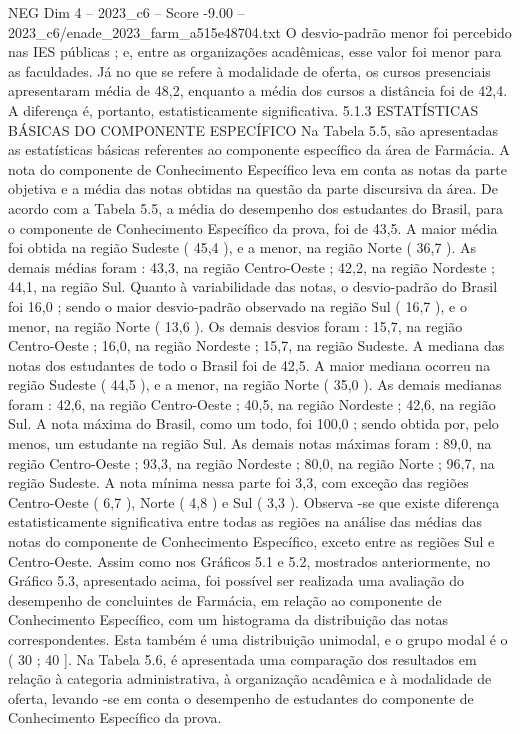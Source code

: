 \begin{textsample}{NEG Dim 4 – 2023\_c6 – Score -9.00 – 2023\_c6/enade\_2023\_farm\_a515e48704.txt}
O desvio-padrão menor foi percebido nas IES públicas ; e, entre as organizações acadêmicas, esse valor foi menor para as faculdades.
Já no que se refere à modalidade de oferta, os cursos presenciais apresentaram média de 48,2, enquanto a média dos cursos a distância foi de 42,4.
A diferença é, portanto, estatisticamente significativa. 5.1.3 ESTATÍSTICAS BÁSICAS DO COMPONENTE ESPECÍFICO Na Tabela 5.5, são apresentadas as estatísticas básicas referentes ao componente específico da área de Farmácia.
A nota do componente de Conhecimento Específico leva em conta as notas da parte objetiva e a média das notas obtidas na questão da parte discursiva da área.
De acordo com a Tabela 5.5, a média do desempenho dos estudantes do Brasil, para o componente de Conhecimento Específico da prova, foi de 43,5.
A maior média foi obtida na região Sudeste ( 45,4 ), e a menor, na região Norte ( 36,7 ).
As demais médias foram : 43,3, na região Centro-Oeste ; 42,2, na região Nordeste ; 44,1, na região Sul.
Quanto à variabilidade das notas, o desvio-padrão do Brasil foi 16,0 ; sendo o maior desvio-padrão observado na região Sul ( 16,7 ), e o menor, na região Norte ( 13,6 ).
Os demais desvios foram : 15,7, na região Centro-Oeste ; 16,0, na região Nordeste ; 15,7, na região Sudeste.
A mediana das notas dos estudantes de todo o Brasil foi de 42,5.
A maior mediana ocorreu na região Sudeste ( 44,5 ), e a menor, na região Norte ( 35,0 ).
As demais medianas foram : 42,6, na região Centro-Oeste ; 40,5, na região Nordeste ; 42,6, na região Sul.
A nota máxima do Brasil, como um todo, foi 100,0 ; sendo obtida por, pelo menos, um estudante na região Sul.
As demais notas máximas foram : 89,0, na região Centro-Oeste ; 93,3, na região Nordeste ; 80,0, na região Norte ; 96,7, na região Sudeste.
A nota mínima nessa parte foi 3,3, com exceção das regiões Centro-Oeste ( 6,7 ), Norte ( 4,8 ) e Sul ( 3,3 ).
Observa -se que existe diferença estatisticamente significativa entre todas as regiões na análise das médias das notas do componente de Conhecimento Específico, exceto entre as regiões Sul e Centro-Oeste.
Assim como nos Gráficos 5.1 e 5.2, mostrados anteriormente, no Gráfico 5.3, apresentado acima, foi possível ser realizada uma avaliação do desempenho de concluintes de Farmácia, em relação ao componente de Conhecimento Específico, com um histograma da distribuição das notas correspondentes.
Esta também é uma distribuição unimodal, e o grupo modal é o ( 30 ; 40 ].
Na Tabela 5.6, é apresentada uma comparação dos resultados em relação à categoria administrativa, à organização acadêmica e à modalidade de oferta, levando -se em conta o desempenho de estudantes do componente de Conhecimento Específico da prova.

\end{textsample}
